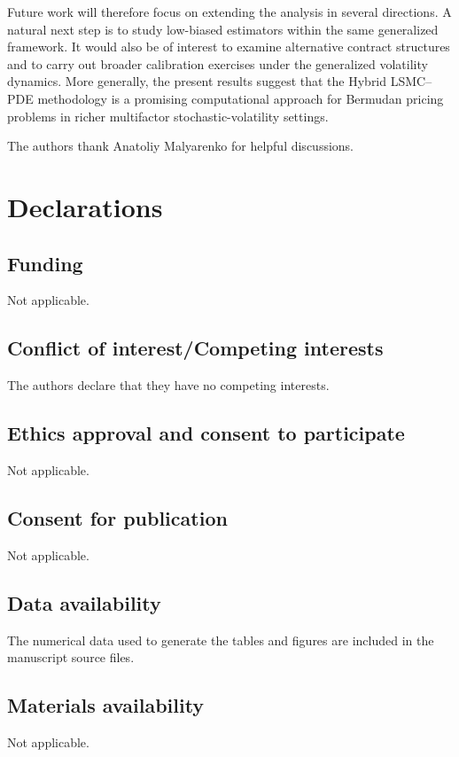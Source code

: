 \documentclass[pdflatex,sn-mathphys-num]{sn-jnl}
\theoremstyle{thmstyleone}%
\theoremstyle{thmstylethree}%
\theoremstyle{thmstyletwo}%
\begin{document}
Future work will therefore focus on extending the analysis in several directions. A natural next step is to study low-biased estimators within the same generalized framework. It would also be of interest to examine alternative contract structures and to carry out broader calibration exercises under the generalized volatility dynamics. More generally, the present results suggest that the Hybrid LSMC--PDE methodology is a promising computational approach for Bermudan pricing problems in richer multifactor stochastic-volatility settings.



\backmatter

The authors thank Anatoliy Malyarenko for helpful discussions.

\section*{Declarations}

\subsection*{Funding}
Not applicable.

\subsection*{Conflict of interest/Competing interests}
The authors declare that they have no competing interests.

\subsection*{Ethics approval and consent to participate}
Not applicable.

\subsection*{Consent for publication}
Not applicable.

\subsection*{Data availability}
The numerical data used to generate the tables and figures are included in the manuscript source files.

\subsection*{Materials availability}
Not applicable.
\end{document}
